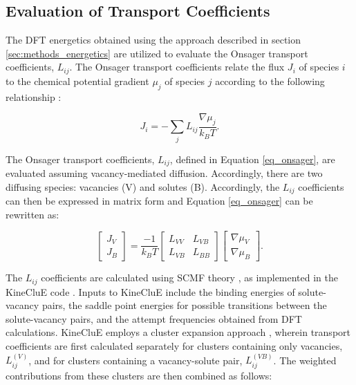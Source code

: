 \documentclass[preprint,12pt]{elsarticle}
\begin{document}
\subsection{Evaluation of Transport Coefficients}

The DFT energetics obtained using the approach described in section \ref{sec:methods_energetics} are utilized to evaluate the Onsager transport coefficients, $L_{ij}$. The Onsager transport coefficients relate the flux $J_i$ of species $i$ to the chemical potential gradient $\mu_j$ of species $j$ according to the following relationship \citep{allnatt_atomic_2003}:

\begin{equation}
   J_i = -\sum_j{L_{ij} \frac{\nabla\mu_j}{k_B T}}. 
   \label{eq_onsager}
\end{equation}

The Onsager transport coefficients, $L_{ij}$, defined in Equation \ref{eq_onsager}, are evaluated assuming vacancy-mediated diffusion. Accordingly, there are two diffusing species: vacancies (V) and solutes (B). Accordingly, the $L_{ij}$ coefficients can then be expressed in matrix form and Equation \ref{eq_onsager} can be rewritten as:

\begin{equation}
\label{matrix_form_onsager}
    \begin{bmatrix}
        J_V \\
        J_B 
    \end{bmatrix}=\frac{-1}{k_B T}
    \begin{bmatrix}
    L_{VV} & L_{VB} \\
    L_{VB} & L_{BB}
    \end{bmatrix}
        \begin{bmatrix}
        \nabla\mu_V \\
        \nabla\mu_B
    \end{bmatrix}.
\end{equation}

\noindent The $L_{ij}$ coefficients are calculated using SCMF theory \citep{nastar_self-consistent_2000, nastar_mean_2005}, as implemented in the KineCluE code \citep{schuler_kineclue_2020}. Inputs to KineCluE include the binding energies of solute-vacancy pairs, the saddle point energies for possible transitions between the solute-vacancy pairs, and the attempt frequencies obtained from DFT calculations. KineCluE employs a cluster expansion approach \citep{schuler_kineclue_2020}, wherein transport coefficients are first calculated separately for clusters containing only vacancies, $L_{ij}^{(V)}$, and for clusters containing a vacancy-solute pair, $L_{ij}^{(VB)}$. The weighted contributions from these clusters are then combined as follows:
\end{document}
